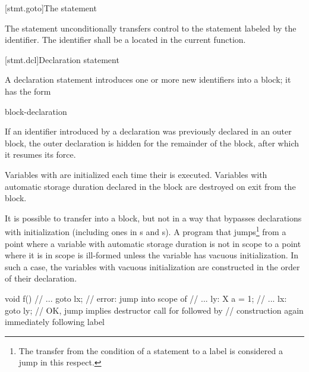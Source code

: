[stmt.goto]{The  statement}%

\pnum
The  statement unconditionally transfers control to the
statement labeled by the identifier. The identifier shall be a
%
 located in the current function.

[stmt.dcl]{Declaration statement}%

\pnum
A declaration statement introduces one or more new identifiers into a
block; it has the form
\begin{bnf}
\br
    block-declaration
\end{bnf}

If an identifier introduced by a declaration was previously declared in
an outer block,
%
%
%
the outer declaration is hidden for the remainder of the block, after
which it resumes its force.

\pnum
{}%
%
Variables with  are
initialized each time their  is executed.
%
Variables with automatic storage duration declared in the block are
destroyed on exit from the block.

\pnum
{}%
%
It is possible to transfer into a block, but not in a way that bypasses
declarations with initialization (including ones in s
and s).
A program that jumps\footnote{The transfer from the condition of a  statement to a
 label is considered a jump in this respect.}
from a point where a variable with automatic storage duration is
not in scope to a point where it is in scope is ill-formed unless
the variable has vacuous initialization.
In such a case, the variables with vacuous initialization
are constructed in the order of their declaration.
\begin{example}
\begin{codeblock}
void f() {
  // ...
  goto lx;          // error: jump into scope of 
  // ...
ly:
  X a = 1;
  // ...
lx:
  goto ly;          // OK, jump implies destructor call for  followed by
                    // construction again immediately following label 
}
\end{codeblock}
\end{example}


